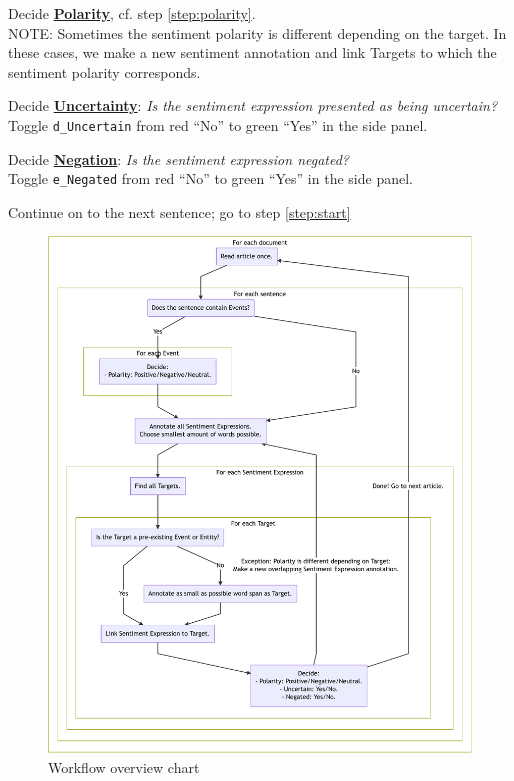 \begin{steps}[leftmargin=*]
        \item Decide \hyperlink{sec:polaritydefinition}{\textbf{Polarity}}, cf. step \ref{step:polarity}.\\
        \textcolor{BrickRed}{NOTE: Sometimes the sentiment polarity is different depending on the target. In these cases, we make a new sentiment annotation and link Targets to which the sentiment polarity corresponds.}
        
        \item Decide \hyperlink{sec:uncertaintydefinition}{\textbf{Uncertainty}}: \textit{Is the sentiment expression presented as being uncertain?}\\
        \textcolor{OliveGreen}{
        Toggle \texttt{d\_Uncertain} from red ``No'' to green ``Yes'' in the side panel.
        }
        
        \item Decide \hyperlink{sec:negationdefinition}{\textbf{Negation}}: \textit{Is the sentiment expression negated?}\\
        \textcolor{OliveGreen}{
        Toggle \texttt{e\_Negated} from red ``No'' to green ``Yes'' in the side panel.
        }
        
    \item Continue on to the next sentence; go to step \ref{step:start}
    
\end{steps}

\begin{figure}[!htb]
    \centering
    \caption*{Workflow overview chart}
    \includegraphics[width=\textwidth]{img/workflow-diagram-cropped.pdf}
\end{figure}